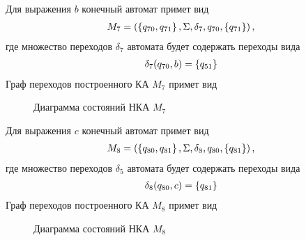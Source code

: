 Для выражения \(b\) конечный автомат примет вид
\begin{align*}
	M_7 = \left(\left\{q_{70}, q_{71}\right\}, \Sigma, \delta_7, q_{70}, \left\{q_{71}\right\}\right),
\end{align*}
где множество переходов \(\delta_7\) автомата будет содержать переходы вида
\begin{align*}
	\delta_7(q_{70}, b) = \left\{q_{51}\right\}
\end{align*}
Граф переходов построенного КА \(M_7\) примет вид
\begin{figure}[h!]
	\centering
	\caption{Диаграмма состояний НКА \(M_7\)}
\end{figure}


Для выражения \(c\) конечный автомат примет вид
\begin{align*}
	M_8 = \left(\left\{q_{80}, q_{81}\right\}, \Sigma, \delta_8, q_{80}, \left\{q_{81}\right\}\right),
\end{align*}
где множество переходов \(\delta_5\) автомата будет содержать переходы вида
\begin{align*}
	\delta_8(q_{80}, c) = \left\{q_{81}\right\}
\end{align*}
Граф переходов построенного КА \(M_8\) примет вид
\begin{figure}[h!]
	\centering
	\caption{Диаграмма состояний НКА \(M_8\)}
\end{figure}
